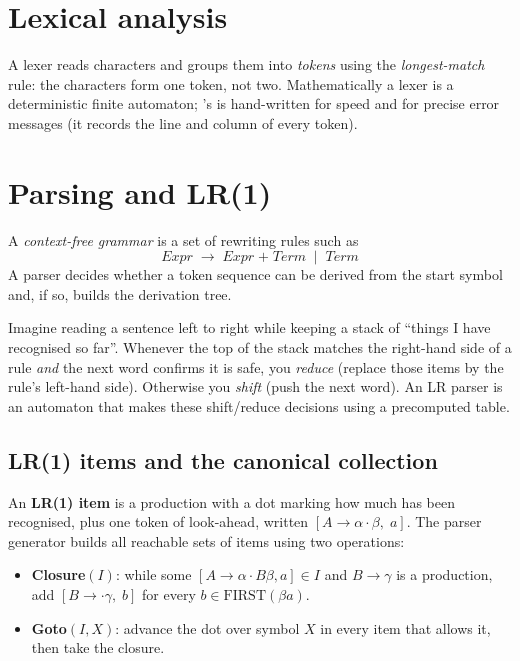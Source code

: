 \section{Lexical analysis}
A lexer reads characters and groups them into \emph{tokens} using the \emph{longest-match} rule: the characters \code{<=} form one token, not two. Mathematically a lexer is a deterministic finite automaton; \nova{}'s is hand-written for speed and for precise error messages (it records the line and column of every token).

\section{Parsing and LR(1)}
A \emph{context-free grammar} is a set of rewriting rules such as
\[ \textit{Expr} \;\to\; \textit{Expr}\;\texttt{+}\;\textit{Term} \;\mid\; \textit{Term} \]
A parser decides whether a token sequence can be derived from the start symbol and, if so, builds the derivation tree.

\begin{plain}
Imagine reading a sentence left to right while keeping a stack of ``things I have recognised so far''. Whenever the top of the stack matches the right-hand side of a rule \emph{and} the next word confirms it is safe, you \emph{reduce} (replace those items by the rule's left-hand side). Otherwise you \emph{shift} (push the next word). An LR parser is an automaton that makes these shift/reduce decisions using a precomputed table.
\end{plain}

\subsection{LR(1) items and the canonical collection}
An \textbf{LR(1) item} is a production with a dot marking how much has been recognised, plus one token of look-ahead, written $[A \to \alpha \cdot \beta,\; a]$. The parser generator builds all reachable sets of items using two operations:

\begin{itemize}
  \item \textbf{Closure}$(I)$: while some $[A \to \alpha \cdot B\beta, a] \in I$ and $B \to \gamma$ is a production, add $[B \to \cdot\gamma,\; b]$ for every $b \in \mathrm{FIRST}(\beta a)$.
  \item \textbf{Goto}$(I, X)$: advance the dot over symbol $X$ in every item that allows it, then take the closure.
\end{itemize}

